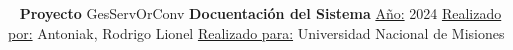 \begin{Center} \
	\vspace{72pt}
	\newline
	{\fontsize{30pt}{36pt}\selectfont
	\textbf{Proyecto}}
	\newline
	\huge{GesServOrConv}
	\vspace{72pt}
	\newline
	{\fontsize{30pt}{36pt}\selectfont
	\textbf{Docuentaci\'on del Sistema}}
	\vspace{36pt}
	\newline
	\huge{\underline{A\~no:} 2024}
	\vspace{144pt}
	\newline
	\large{
		\underline{Realizado por:}
		Antoniak, Rodrigo Lionel
	}
	\newline
	\large{
		\underline{Realizado para:}
		Universidad Nacional de Misiones
	}
\end{Center}
